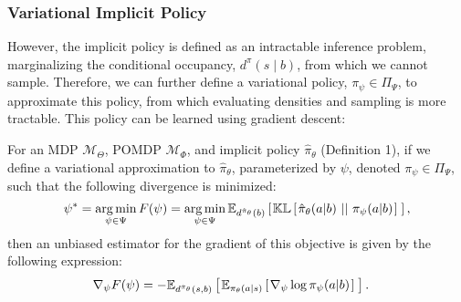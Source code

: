 \subsubsection{Variational Implicit Policy}\label{supp:sec:vap}
However, the implicit policy is defined as an intractable inference problem, marginalizing the conditional occupancy, $d^{\pi}(s \mid b)$, from which we cannot sample.  Therefore, we can further define a variational policy, $\pi_{\psi} \in \Pi_{\Psi}$, to approximate this policy, from which evaluating densities and sampling is more tractable.  This policy can be learned using gradient descent:
\begin{lemma}
For an MDP $\mathcal{M}_{\Theta}$, POMDP $\mathcal{M}_{\Phi}$, and implicit policy $\hat{\pi}_{\theta}$ (Definition 1), if we define a variational approximation to $\hat{\pi}_{\theta}$, parameterized by $\psi$, denoted $\pi_{\psi} \in \Pi_{\Psi}$, such that the following divergence is minimized:
\begin{equation}
    \psi^* = \mathop{\operatorname{arg\,min}}_{\psi \in \Psi} F(\psi) = \mathop{\operatorname{arg\,min}}_{\psi \in \Psi} \mathbb{E}_{d^{\hat{\pi}_{\theta}}(b)} \left[ \hspace*{0.1em}{}  \mathbb{KL} \left[ \hspace*{0.1em}{}  {\hat{\pi}_{\theta}}(a|b) \ ||\ {}  \pi_{\psi}(a|b) \hspace*{0.1em} \right]{}  \hspace*{0.1em} \right]{} ,\label{supp:equ:l1:1}
\end{equation}
then an unbiased estimator for the gradient of this objective is given by the following expression:
\begin{align}
    \nabla_{\psi} F (\psi) &= - \mathbb{E}_{d^{\hat{\pi}_{\theta}}(s,b)} \left[ \hspace*{0.1em}{}  \mathbb{E}_{\pi_{\theta}(a | s)} \left[ \hspace*{0.1em}{}  \nabla_{\psi} \log \pi_{\psi} (a | b) \hspace*{0.1em} \right]{}  \hspace*{0.1em} \right]{} .
\end{align}
\end{lemma}
